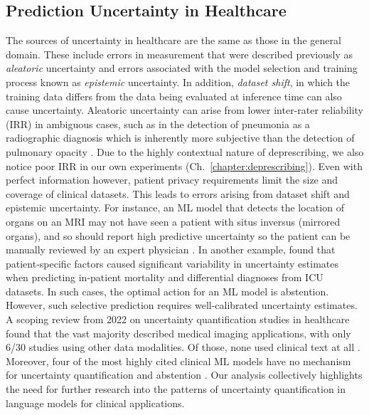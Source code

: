 

\subsection{Prediction Uncertainty in Healthcare}
The sources of uncertainty in healthcare are the same as those in the general domain. These include errors in measurement that were described previously as \emph{aleatoric} uncertainty and errors associated with the model selection and training process known as \emph{epistemic} uncertainty. In addition, \emph{dataset shift}, in which the training data differs from the data being evaluated at inference time can also cause uncertainty. Aleatoric uncertainty can arise from lower inter-rater reliability (IRR) in ambiguous cases, such as in the detection of pneumonia as a radiographic diagnosis which is inherently more subjective than the detection of pulmonary opacity \citep{chuaTacklingPredictionUncertainty2023}. Due to the highly contextual nature of deprescribing, we also notice poor IRR in our own experiments (Ch.~\ref{chapter:deprescribing}). Even with perfect information however, patient privacy requirements limit the size and coverage of clinical datasets. This leads to errors arising from dataset shift and epistemic uncertainty. For instance, an ML model that detects the location of organs on an MRI may not have seen a patient with situs inversus (mirrored organs), and so should report high predictive uncertainty so the patient can be manually reviewed by an expert physician \citep{kompaSecondOpinionNeeded2021}. In another example, \citet{dusenberryAnalyzingRoleModel2020} found that patient-specific factors caused significant variability in uncertainty estimates when predicting in-patient mortality and differential diagnoses from ICU datasets. In such cases, the optimal action for an ML model is abstention. However, such selective prediction requires well-calibrated uncertainty estimates. A scoping review from 2022 on uncertainty quantification studies in healthcare found that the vast majority described medical imaging applications, with only 6/30 studies using other data modalities. Of those, none used clinical text at all \citep{loftusUncertaintyawareDeepLearning2022a}. Moreover, four of the most highly cited clinical ML models have no mechanism for uncertainty quantification and abstention \citep{kompaSecondOpinionNeeded2021}. Our analysis collectively highlights the need for further research into the patterns of uncertainty quantification in language models for clinical applications.

